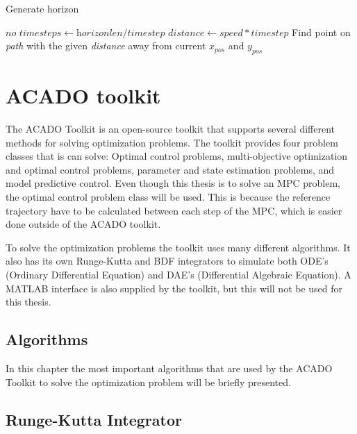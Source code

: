 \begin{algorithm}
\caption{Generate horizon}
\label{alg:genHor}
\begin{algorithmic}
	\State $\textit{no timesteps} \gets \textit{horizonlen}/\textit{timestep}$
	\State $\textit{distance} \gets \textit{speed} * \textit{timestep}$
		Find point on \textit{path} with the given \textit{distance} away from current \textit{$x_{pos}$} and \textit{$y_{pos}$}
		
	\EndFor
\EndProcedure
\end{algorithmic}
\end{algorithm}


\section{ACADO toolkit}

The ACADO Toolkit is an open-source toolkit that supports several different methods for solving optimization problems. The toolkit provides four problem classes that is can solve: Optimal control problems, multi-objective optimization and optimal control problems, parameter and state estimation problems, and model predictive control. Even though this thesis is to solve an MPC problem, the optimal control problem class will be used. This is because the reference trajectory have to be calculated between each step of the MPC, which is easier done outside of the ACADO toolkit.

To solve the optimization problems the toolkit uses many different algorithms. It also has its own Runge-Kutta and BDF integrators to simulate both ODE's (Ordinary Differential Equation) and DAE's (Differential Algebraic Equation). A MATLAB interface is also supplied by the toolkit, but this will not be used for this thesis.


\subsection{Algorithms}

In this chapter the most important algorithms that are used by the ACADO Toolkit to solve the optimization problem will be briefly presented.


\subsection{Runge-Kutta Integrator}
